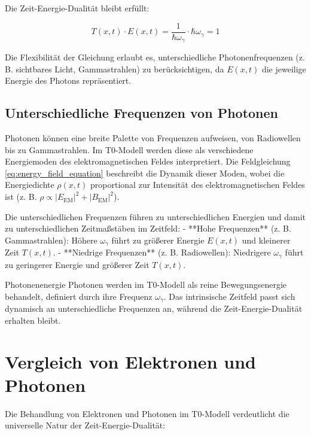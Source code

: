 \documentclass[12pt,a4paper]{article}
\begin{document}
	Die Zeit-Energie-Dualität bleibt erfüllt:
	
	\begin{equation}
		T(x,t) \cdot E(x,t) = \frac{1}{\hbar \omega_\gamma} \cdot \hbar \omega_\gamma = 1
	\end{equation}
	
	Die Flexibilität der Gleichung erlaubt es, unterschiedliche Photonenfrequenzen (z. B. sichtbares Licht, Gammastrahlen) zu berücksichtigen, da \( E(x,t) \) die jeweilige Energie des Photons repräsentiert.
	
	\subsection{Unterschiedliche Frequenzen von Photonen}
	\label{subsec:photon_frequencies}
	
	Photonen können eine breite Palette von Frequenzen aufweisen, von Radiowellen bis zu Gammastrahlen. Im T0-Modell werden diese als verschiedene Energiemoden des elektromagnetischen Feldes interpretiert. Die Feldgleichung \eqref{eq:energy_field_equation} beschreibt die Dynamik dieser Moden, wobei die Energiedichte \(\rho(x,t)\) proportional zur Intensität des elektromagnetischen Feldes ist (z. B. \( \rho \propto |E_{\text{EM}}|^2 + |B_{\text{EM}}|^2 \)).
	
	Die unterschiedlichen Frequenzen führen zu unterschiedlichen Energien und damit zu unterschiedlichen Zeitmaßstäben im Zeitfeld:
	- **Hohe Frequenzen** (z. B. Gammastrahlen): Höhere \(\omega_\gamma\) führt zu größerer Energie \( E(x,t) \) und kleinerer Zeit \( T(x,t) \).
	- **Niedrige Frequenzen** (z. B. Radiowellen): Niedrigere \(\omega_\gamma\) führt zu geringerer Energie und größerer Zeit \( T(x,t) \).
	
	\begin{important}{Photonenenergie}{}
		Photonen werden im T0-Modell als reine Bewegungsenergie behandelt, definiert durch ihre Frequenz \(\omega_\gamma\). Das intrinsische Zeitfeld passt sich dynamisch an unterschiedliche Frequenzen an, während die Zeit-Energie-Dualität erhalten bleibt.
	\end{important}
	
	\section{Vergleich von Elektronen und Photonen}
	\label{sec:comparison}
	
	Die Behandlung von Elektronen und Photonen im T0-Modell verdeutlicht die universelle Natur der Zeit-Energie-Dualität:
	
\end{document}

